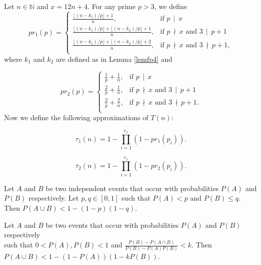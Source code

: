\documentclass[10pt,a4paper]{amsart}
\newcommand{\Div}[2]{#1\,\mid\, #2}
\newcommand{\Nat}{\mathbb{N}}
\newcommand{\nDiv}[2]{#1\,\nmid\, #2}
\begin{document}
\begin{definition}\label{defeta13}
Let $n\in\Nat$ and $x=12n+4$. For any prime $p>3$, we define
$$pr_1(p)=\left\{\begin{array}{ll}
\frac{\lfloor (n-k_1)/p\rfloor+1}{n}, & \text{if } \Div{p}{x}\\
\frac{\lfloor (n-k_1)/p\rfloor + \lfloor (n-k_2)/p\rfloor +1}{n}, & \text{if } \nDiv{p}{x}\text{ and } \Div{3}{p+1}\\
\frac{\lfloor (n-k_1)/p\rfloor + \lfloor (n-k_2)/p\rfloor +2}{n}, & \text{if } \nDiv{p}{x}\text{ and } \nDiv{3}{p+1},\\
\end{array}\right.$$
where $k_1$ and $k_2$ are defined as in Lemma \ref{lemfp4} and

$$pr_2 (p)=\left\{\begin{array}{ll}
\frac{1}{p}+\frac{1}{n}, & \text{if } \Div{p}{x}\\
\frac{2}{p}+\frac{1}{n}, & \text{if } \nDiv{p}{x}\text{ and } \Div{3}{p+1}\\
\frac{2}{p}+\frac{2}{n}, & \text{if } \nDiv{p}{x}\text{ and } \nDiv{3}{p+1}.\\
\end{array}\right.$$
Now we define the following approximations of $T(n)$:

\begin{equation}\label{eqneta5n}
\tau_1(n)=1-\prod\limits_{i=1}^{r_x} (1-pr_1(p_i)).
\end{equation}

\begin{equation}\label{eqneta6n}
\tau_2(n)=1-\prod\limits_{i=1}^{r_x} (1-pr_2 (p_i)).
\end{equation}
\end{definition}

\begin{lemma}\label{lemins}
Let $A$ and $B$ be two independent events that occur with probabilities $P(A)$ and $P(B)$ respectively. Let $p,q\in [0,1]$ such that $P(A)<p$ and $P(B)\leq q$. Then $P(A\cup B)<1 - (1 - p) (1 -q)$.
\end{lemma}

\begin{lemma}\label{lemk}
Let $A$ and $B$ be two events that occur with probabilities $P(A)$ and $P(B)$ respectively\\[0.5em]
 such that $0<P(A),P(B)<1$ and $\frac{P(B)-P(A\cap B)}{P(B)-P(A)P(B)}<k$. Then $P(A\cup B)<1-(1-P(A))(1-kP(B))$.
\end{lemma}
\end{document}
